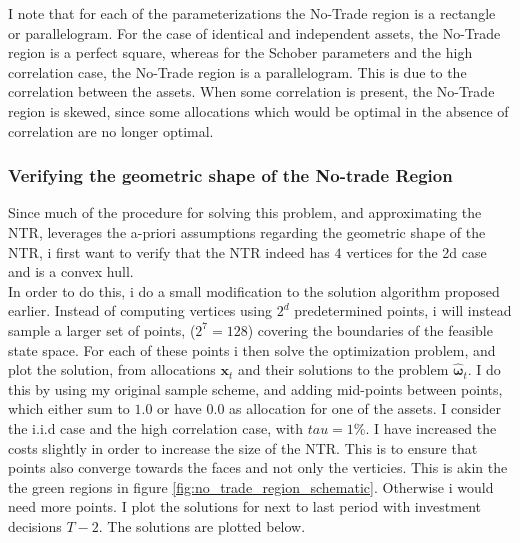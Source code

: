 \documentclass[11pt]{article}
\begin{document}
I note that for each of the parameterizations the No-Trade region is a rectangle or parallelogram.
For the case of identical and independent assets, the No-Trade region is a perfect square, whereas for the Schober parameters and the high correlation case,
the No-Trade region is a parallelogram. This is due to the correlation between the assets. When some correlation is present, the No-Trade region is skewed,
since some allocations which would be optimal in the absence of correlation are no longer optimal.

\subsubsection{Verifying the geometric shape of the No-trade Region}\label{Subsubsection: ConfirmShape}
Since much of the procedure for solving this problem, and approximating the NTR, leverages
the a-priori assumptions regarding the geometric shape of the NTR, i first want to verify that the
NTR indeed has $4$ vertices for the 2d case and is a convex hull.\\
In order to do this, i do a small modification to the solution algorithm proposed earlier.
Instead of computing vertices using $2^{d}$ predetermined points, i will instead
sample a larger set of points, ($2^7 = 128$) covering the boundaries of the feasible state space.
For each of these points i then solve the optimization problem,
and plot the solution, from allocations $\mathbf{x}_{t}$ and their solutions to the problem $\hat{\boldsymbol{\omega}}_{t}$.
I do this by using my original sample scheme, and adding mid-points between points,
which either sum to $1.0$ or have $0.0$ as allocation for one of the assets.
I consider the i.i.d case and the high correlation case, with $tau = 1\%$. I have increased the costs slightly in order to increase the
size of the NTR. This is to ensure that points also converge towards the faces and not only the verticies.
This is akin the the green regions in figure \ref{fig:no_trade_region_schematic}.
Otherwise i would need more points. I plot the solutions for next to last period with investment decisions $T-2$.
The solutions are plotted below.
\end{document}
